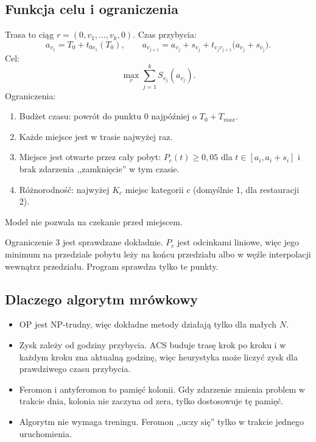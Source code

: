 \documentclass[11pt,a4paper]{article}
\begin{document}
\subsection{Funkcja celu i ograniczenia}

Trasa to ciąg $r = (0, v_1, \ldots, v_k, 0)$. Czas przybycia:
\begin{equation}
a_{v_1} = T_0 + t_{0 v_1}(T_0), \qquad a_{v_{j+1}} = a_{v_j} + s_{v_j} + t_{v_j v_{j+1}}\bigl(a_{v_j} + s_{v_j}\bigr).
\end{equation}
Cel:
\begin{equation}
\max_r \sum_{j=1}^{k} S_{v_j}(a_{v_j}).
\end{equation}
Ograniczenia:
\begin{enumerate}
  \item Budżet czasu: powrót do punktu 0 najpóźniej o $T_0 + T_{max}$.
  \item Każde miejsce jest w trasie najwyżej raz.
  \item Miejsce jest otwarte przez cały pobyt: $P_c(t) \geq 0{,}05$ dla $t \in [a_i, a_i + s_i]$ i brak zdarzenia ,,zamknięcie'' w tym czasie.
  \item Różnorodność: najwyżej $K_c$ miejsc kategorii $c$ (domyślnie 1, dla restauracji 2).
\end{enumerate}
Model nie pozwala na czekanie przed miejscem.

Ograniczenie 3 jest sprawdzane dokładnie. $P_c$ jest odcinkami liniowe, więc jego minimum na przedziale pobytu leży na końcu przedziału albo w węźle interpolacji wewnątrz przedziału. Program sprawdza tylko te punkty.

\subsection{Dlaczego algorytm mrówkowy}

\begin{itemize}
  \item OP jest NP-trudny, więc dokładne metody działają tylko dla małych $N$.
  \item Zysk zależy od godziny przybycia. ACS buduje trasę krok po kroku i w każdym kroku zna aktualną godzinę, więc heurystyka może liczyć zysk dla prawdziwego czasu przybycia.
  \item Feromon i antyferomon to pamięć kolonii. Gdy zdarzenie zmienia problem w trakcie dnia, kolonia nie zaczyna od zera, tylko dostosowuje tę pamięć.
  \item Algorytm nie wymaga treningu. Feromon ,,uczy się'' tylko w trakcie jednego uruchomienia.
\end{itemize}
\end{document}
